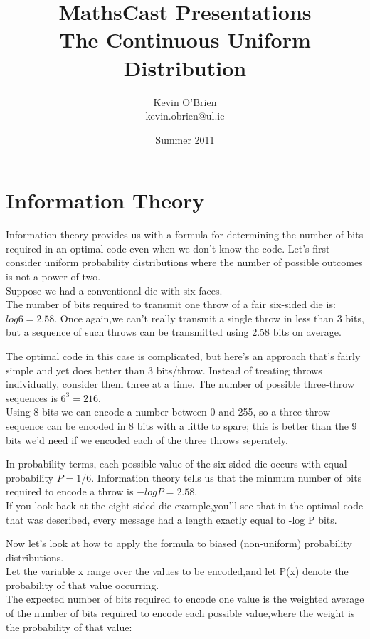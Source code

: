 \documentclass[a4]{beamer}
\title[MathsCast]{MathsCast Presentations \\ {\normalsize The Continuous Uniform Distribution}}
\author[Kevin O'Brien]{Kevin O'Brien \\ {\scriptsize kevin.obrien@ul.ie}}
\date{Summer 2011}
\institute[Maths \& Stats]{Dept. of Mathematics \& Statistics, \\ University \textit{of} Limerick}
\begin{document}
\section{Information Theory}
\begin{frame}
Information theory provides us with a formula for determining the number of bits required in an optimal code even when we don't know the code. Let's first consider uniform probability distributions where the number of possible outcomes is not a power of two. \\Suppose we had a conventional die with six faces.\\ The number of bits required to transmit one throw of a fair six-sided die is:$ log 6 = 2.58$. Once again,we can't really transmit a single throw in less than 3 bits, but a sequence of such throws can be transmitted using 2.58 bits on average. 
\end{frame}
\begin{frame}
\large
The optimal code in this case is complicated, but here's an approach that's fairly simple and yet does better than 3 bits/throw. Instead of treating throws individually, consider them three at a time. The number of possible three-throw sequences is $6^3= 216$. \\Using 8 bits we can encode a number between 0 and 255, so a three-throw sequence can be encoded in 8 bits with a little to spare; this is better than the 9 bits we'd need if we encoded each of the three throws seperately.
\end{frame}
\begin{frame}
\large
In probability terms, each possible value of the six-sided die occurs with equal probability $P=1/6$. Information theory tells us that the minmum number of bits required to encode a throw is $-log P = 2.58$.\\ If you look back at the eight-sided die example,you'll see that in the optimal code that was described, every message had a length exactly equal to -log P bits.
\end{frame}
\begin{frame}
\large Now let's look at how to apply the formula to biased (non-uniform) probability distributions.\\ Let the variable x range over the values to be encoded,and let P(x) denote the probability of that value occurring.\\ The expected number of bits required to encode one value is the weighted average of the number of bits required to encode each possible value,where the weight is the probability of that value: 
\end{frame}
\end{document}
